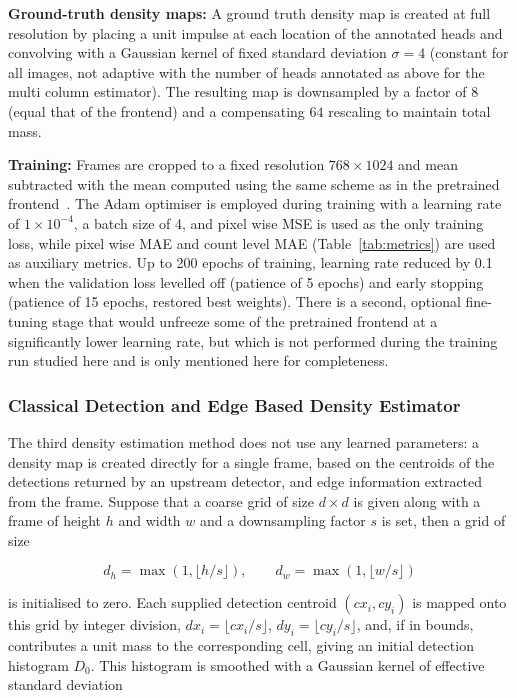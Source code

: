 \textbf{Ground-truth density maps:}  A ground truth density map is created at full resolution by placing a unit impulse at each location of the annotated heads and convolving with a Gaussian kernel of fixed standard deviation $\sigma = 4$ (constant for all images, not adaptive with the number of heads annotated as above for the multi column estimator). The resulting map is downsampled by a factor of $8$ (equal that of the frontend) and a compensating $64$ rescaling to maintain total mass.

\textbf{Training:} Frames are cropped to a fixed resolution $768{\times}1024$ and mean subtracted with the mean computed using the same scheme as in the pretrained frontend~\cite{simonyan2015vgg}. The Adam optimiser is employed during training with a learning rate of $1\times 10^{-4}$, a batch size of 4, and pixel wise MSE is used as the only training loss, while pixel wise MAE and count level MAE (Table~\ref{tab:metrics}) are used as auxiliary metrics. Up to 200 epochs of training, learning rate reduced by 0.1 when the validation loss levelled off (patience of 5 epochs) and early stopping (patience of 15 epochs, restored best weights). There is a second, optional fine-tuning stage that would unfreeze some of the pretrained frontend at a significantly lower learning rate, but which is not performed during the training run studied here and is only mentioned here for completeness.

\subsubsection{Classical Detection and Edge Based Density Estimator}
\label{sec:classical-density}

The third density estimation method does not use any learned parameters: a density map is created directly for a single frame, based on the centroids of the detections returned by an upstream detector, and edge information extracted from the frame. Suppose that a coarse grid of size $d \times d$ is given along with a frame of height $h$ and width $w$ and a downsampling factor $s$ is set, then a grid of size

\begin{equation}
	d_h = \max(1, \lfloor h/s \rfloor), \qquad d_w = \max(1, \lfloor w/s \rfloor)
\end{equation}

is initialised to zero. Each supplied detection centroid $(cx_i,cy_i)$ is mapped onto this grid by integer division, $dx_i = \lfloor cx_i/s\rfloor$, $dy_i = \lfloor cy_i/s\rfloor$, and, if in bounds, contributes a unit mass to the corresponding cell, giving an initial detection histogram $D_0$. This histogram is smoothed with a Gaussian kernel of effective standard deviation

